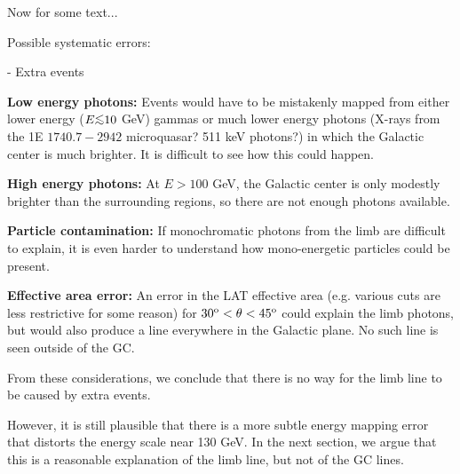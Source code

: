 \documentclass[aps,twocolumn,prd,superscriptaddress,showpacs,nofootinbib,fixfloat]{revtex4}
\newcommand{\degree}{^{\rm o}}
\def\la{\vcenter{\hbox{$<$}\offinterlineskip\hbox{$\sim$}}}
\begin{document}
\clearpage
Now for some text...


Possible systematic errors:

- Extra events

{\bf Low energy photons:} Events would have to be mistakenly mapped from
either lower energy ($E \la 10$ GeV) gammas or much lower energy photons
(X-rays from the 1E $1740.7-2942$ microquasar?  511 keV photons?) in which the
Galactic center is much brighter.  It is difficult to see how this could
happen.

{\bf High energy photons:} At $E > 100$ GeV, the Galactic center is only
modestly brighter than the surrounding regions, so there are not enough
photons available.

{\bf Particle contamination:} If monochromatic photons from the limb are
difficult to explain, it is even harder to understand how mono-energetic
particles could be present. 

{\bf Effective area error:} An error in the LAT effective area (e.g. various
cuts are less restrictive for some reason) for $30\degree < \theta <
45\degree$ could explain the limb photons, but would also produce a line
everywhere in the Galactic plane.  No such line is seen outside of the GC. 

From these considerations, we conclude that there is no way for the limb line
to be caused by extra events. 

However, it is still plausible that there is a more subtle energy mapping
error that distorts the energy scale near 130 GeV.  In the next section, we
argue that this is a reasonable explanation of the limb line, but not of the
GC lines. 
\end{document}
